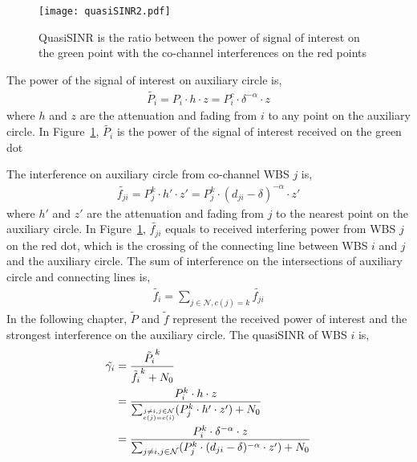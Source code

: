 \begin{figure}[h!]
  \centering
  \texttt{[image: quasiSINR2.pdf]}
  \caption{QuasiSINR is the ratio between the power of signal of interest on the green point with the co-channel interferences on the red points}
\label{quasiSINRfigure}
\end{figure}


The power of the signal of interest on auxiliary circle is,
\begin{equation}
\label{quasiSINR_1}
\begin{aligned}
\tilde{P_i} = P_i\cdot h\cdot z = P_i^c\cdot \delta^{-\alpha}\cdot z
\end{aligned}
\end{equation}	
where $h$ and $z$ are the attenuation and fading from $i$ to any point on the auxiliary circle.
In Figure~\ref{quasiSINRfigure}, $\tilde{P_i}$ is the power of the signal of interest received on the green dot 

The interference on auxiliary circle from co-channel WBS $j$ is,
\begin{equation}
\label{quasiSINR_inf}
\begin{aligned}
\tilde{f_{ji}} = P_j^k\cdot h'\cdot z' = P_j^k\cdot (d_{ji}-\delta)^{-\alpha}\cdot z'
\end{aligned}
\end{equation}
where $h'$ and $z'$ are the attenuation and fading from $j$ to the nearest point on the auxiliary circle.
In Figure~\ref{quasiSINRfigure}, $\tilde{f_{ji}}$ equals to received interfering power from WBS $j$ on the red dot, which is the crossing of the connecting line between WBS $i$ and $j$ and the auxiliary circle.
The sum of interference on the intersections of auxiliary circle and connecting lines is, 
\begin{equation}
\label{quasiSINR_infs}
\begin{aligned}
\tilde{f_{i}} = \sum_{j\in\mathcal{N}, c(j)=k} \tilde{f_{ji}}
\end{aligned}
\end{equation}	
In the following chapter, $\tilde{P}$ and $\tilde{f}$ represent the received power of interest and the strongest interference on the auxiliary circle.
The quasiSINR of WBS $i$ is, 
\begin{equation}
\label{quasiSINR}
\begin{aligned}
 \tilde{\gamma_{i}} & = \frac{\tilde{P_i}^k}{\tilde{f_i}^k + N_0} \\
&=\frac{P_{i}^k \cdot h \cdot z} {\sum_{\tiny\substack{j\neq i, j\in \mathcal{N}\\c(j)=c(i)}} (P_j^k \cdot h' \cdot z') + N_0}\\
&= \frac{P_{i}^k \cdot \delta^{-\alpha}\cdot z} {\sum_{j\neq i, j\in \mathcal{N}} (P_j^k \cdot (d_{ji}-\delta)^{-\alpha} \cdot z') + N_0}
\end{aligned}
\end{equation}

